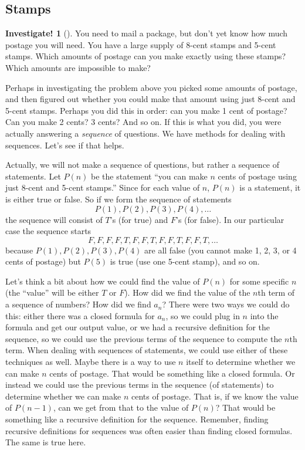\documentclass[10pt,]{book}
\theoremstyle{plain}
\theoremstyle{definition}
\theoremstyle{definition}
\theoremstyle{definition}
\newtheorem{investigation}[project]{Investigate!}
\theoremstyle{definition}
\numberwithin{equation}{chapter}
\begin{document}
\subsection[{Stamps}]{Stamps}\label{subsec_induction-stamps}
\begin{investigation}[]\label{investigation-16}
\hypertarget{p-2088}{}%
You need to mail a package, but don't yet know how much postage you will need. You have a large supply of 8-cent stamps and 5-cent stamps. Which amounts of postage can you make exactly using these stamps? Which amounts are impossible to make?%
\end{investigation}
\hypertarget{p-2089}{}%
Perhaps in investigating the problem above you picked some amounts of postage, and then figured out whether you could make that amount using just 8-cent and 5-cent stamps. Perhaps you did this in order: can you make 1 cent of postage? Can you make 2 cents? 3 cents? And so on. If this is what you did, you were actually answering a \emph{sequence} of questions. We have methods for dealing with sequences. Let's see if that helps.%
\par
\hypertarget{p-2090}{}%
Actually, we will not make a sequence of questions, but rather a sequence of statements. Let \(P(n)\)\label{notation-36}
 be the statement ``you can make \(n\) cents of postage using just 8-cent and 5-cent stamps.'' Since for each value of \(n\), \(P(n)\) is a statement, it is either true or false. So if we form the sequence of statements%
\begin{equation*}
P(1), P(2), P(3), P(4), \ldots
\end{equation*}
the sequence will consist of \(T\)'s (for true) and \(F\)'s (for false). In our particular case the sequence starts%
\begin{equation*}
F,F,F,F,T,F,F,T,F,F,T,F,F,T,\ldots
\end{equation*}
because \(P(1), P(2), P(3), P(4)\) are all false (you cannot make 1, 2, 3, or 4 cents of postage) but \(P(5)\) is true (use one 5-cent stamp), and so on.%
\par
\hypertarget{p-2091}{}%
Let's think a bit about how we could find the value of \(P(n)\) for some specific \(n\) (the ``value'' will be either \(T\) or \(F\)). How did we find the value of the \(n\)th term of a sequence of numbers? How did we find \(a_n\)? There were two ways we could do this: either there was a closed formula for \(a_n\), so we could plug in \(n\) into the formula and get our output value, or we had a recursive definition for the sequence, so we could use the previous terms of the sequence to compute the \(n\)th term. When dealing with sequences of statements, we could use either of these techniques as well. Maybe there is a way to use \(n\) itself to determine whether we can make \(n\) cents of postage. That would be something like a closed formula. Or instead we could use the previous terms in the sequence (of statements) to determine whether we can make \(n\) cents of postage. That is, if we know the value of \(P(n-1)\), can we get from that to the value of \(P(n)\)? That would be something like a recursive definition for the sequence. Remember, finding recursive definitions for sequences was often easier than finding closed formulas. The same is true here.%
\end{document}
